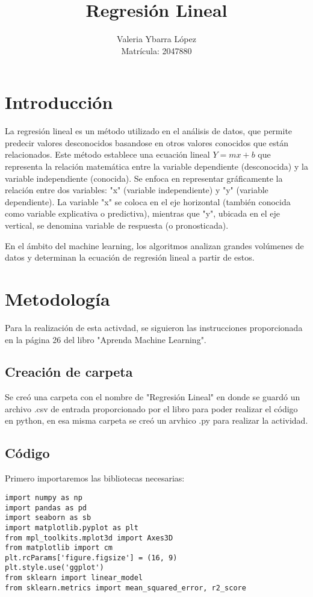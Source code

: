 \documentclass{pssbmac}
\begin{document}
\title{Regresión Lineal}

\author{
    {\large Valeria Ybarra López}\\
    {\small Matrícula: 2047880} \\
}
\criartitulo


\noindent


\section{Introducción}
  
La regresión lineal es un método utilizado en el análisis de datos, que permite predecir valores desconocidos basandose en otros valores conocidos que están relacionados. 
Este método establece una ecuación lineal \(Y=mx + b\) que representa la relación matemática entre la variable dependiente (desconocida) y la variable independiente (conocida). Se enfoca en representar gráficamente la relación entre dos variables: "x" (variable independiente) y "y" (variable dependiente). La variable "x" se coloca en el eje horizontal (también conocida como variable explicativa o predictiva), mientras que "y", ubicada en el eje vertical, se denomina variable de respuesta (o pronosticada).
  
En el ámbito del machine learning, los algoritmos analizan grandes volúmenes de datos y determinan la ecuación de regresión lineal a partir de estos. 

\section{Metodología}

Para la realización de esta activdad, se siguieron las instrucciones proporcionada en la página 26 del libro "Aprenda Machine Learning".
\subsection{Creación de carpeta}
Se creó una carpeta con el nombre de "Regresión Lineal" en donde se guardó un archivo .csv de entrada proporcionado por el libro para poder realizar el código en python, en esa misma carpeta se creó un arvhico .py para realizar la actividad.

\subsection{Código}
Primero importaremos las bibliotecas necesarias:

\vspace{.3cm}
\begin{lstlisting}
import numpy as np
import pandas as pd
import seaborn as sb
import matplotlib.pyplot as plt
from mpl_toolkits.mplot3d import Axes3D
from matplotlib import cm
plt.rcParams['figure.figsize'] = (16, 9)
plt.style.use('ggplot')
from sklearn import linear_model
from sklearn.metrics import mean_squared_error, r2_score
\end{lstlisting}
\end{document}
